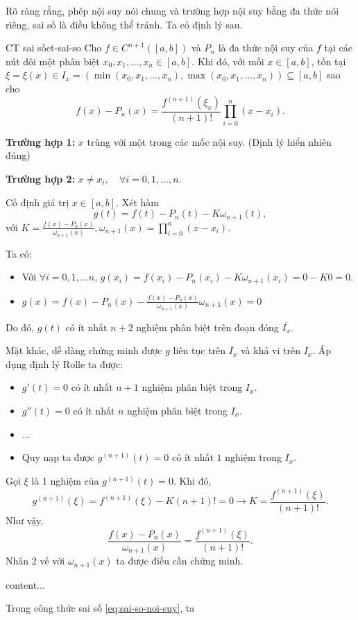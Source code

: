 Rõ ràng rằng, phép nội suy nói chung và trường hợp nội suy bằng đa thức nói riêng, sai số là điều không thể tránh. Ta có định lý sau.
\begin{dinhly}{CT sai số}{ct-sai-so}
Cho $f\in C^{n+1}([a,b])$ và $P_n$ là đa thức nội suy của $f$ tại các nút đôi một phân biệt $x_0,x_1,\dots,x_n\in[a,b]$. Khi đó, với mỗi $x\in[a,b]$, tồn tại $\xi=\xi(x)\in I_x=(\min(x_0, x_1,\dots, x_n), \max(x_0, x_1, \dots, x_n)) \subseteq[a,b]$ sao cho
\begin{equation}
	f(x)-P_n(x)=\frac{f^{(n+1)}(\xi_x)}{(n+1)!}\prod_{i=0}^{n}(x-x_i).
	\label{eq:sai-so-noi-suy}
\end{equation}
\end{dinhly}
\begin{chungminh}
	\textbf{Trường hợp 1:} $x$ trùng với một trong các mốc nội suy. (Định lý hiển nhiên đúng)
	
	\noindent \textbf{Trường hợp 2:} $x \neq x_i, \quad \forall i=0, 1, \dots, n$.
	
	Cố định giá trị $x\in [a, b]$. Xét hàm 
	\[
	g(t)=f(t)-P_n(t)-K \omega _{n+1}(t), 
	\]
	với $K=\displaystyle \frac{f(x)-P_n(x)}{\omega_{n+1}(x)}, \omega_{n+1}(x) = \prod_{i=0}^n (x - x_i)$.
	
	Ta có:
	\begin{itemize}
		\item Với $\forall i =0, 1, \dots n$, $g(x_i)=f(x_i)-P_n(x_i)-K \omega_{n+1}(x_i)=0-K 0 =0$.
		\item $g(x)=f(x)-P_n(x)-\displaystyle \frac{f(x)-P_n(x)}{\omega_{n+1}(x)} \omega_{n+1}(x)=0$
	\end{itemize}
	Do đó, $g(t)$ có ít nhất $n+2$ nghiệm phân biệt trên đoạn đóng $\overline{I_x}$.
	
	Mặt khác, dễ dàng chứng minh được $g$ liên tục trên $\overline{I_x}$ và khả vi trên $I_x$. Áp dụng định lý Rolle ta được:
	\begin{itemize}
		\item $g'(t)=0$ có ít nhất $n+1$ nghiệm phân biệt trong $I_x$.
		\item $g''(t)=0$ có ít nhất $n$ nghiệm phân biệt trong $I_x$.
		\item ...
		\item Quy nạp ta được $g^{(n+1)}(t)=0$ có ít nhất $1$ nghiệm trong $I_x$.
	\end{itemize}
	
	Gọi $\xi$ là 1 nghiệm của $g^{(n+1)}(t)=0$. Khi đó, 
	\[
	g^{(n+1)}(\xi) = f^{(n+1)}(\xi) - K (n+1)! =0 \longrightarrow K = \frac{f^{(n+1)}(\xi)}{(n+1)!}.
	\]
	Như vậy, 
	\[
	\frac{f(x)-P_n(x)}{\omega_{n+1}(x)} = \frac{f^{(n+1)}(\xi)}{(n+1)!}.
	\]
	Nhân 2 vế với $\omega_{n+1}(x)$ ta được điều cần chứng minh.
\end{chungminh}

\begin{nhanxet}
	content...
\end{nhanxet}
Trong công thức sai số \eqref{eq:sai-so-noi-suy}, ta 
